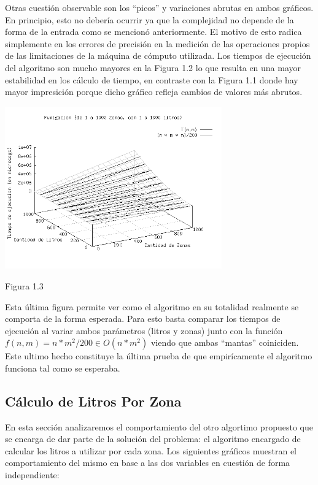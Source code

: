 \documentclass[a4paper,11pt] {article}
\begin{document}
Otras cuestión observable son los ``picos'' y variaciones abrutas en ambos gráficos. En principio, esto no debería ocurrir ya que la complejidad no depende de la forma de la entrada como se mencionó anteriormente. El motivo de esto radica simplemente en los errores de precisión en la medición de las operaciones propios de las limitaciones de la máquina de cómputo utilizada. Los tiempos de ejecución del algoritmo son mucho mayores en la Figura 1.2 lo que resulta en una mayor estabilidad en los cálculo de tiempo, en contraste con la Figura 1.1 donde hay mayor impresición porque dicho gráfico refleja cambios de valores más abrutos.

\begin{center}
 \includegraphics[width=0.7\textwidth]{Plots/Tp2Ej1-TiemposFumigacion-3d-bw.png}
\begin{center}
Figura 1.3
\end{center}
\end{center}

Esta última figura permite ver como el algoritmo en su totalidad realmente se comporta de la forma esperada. 
Para esto basta comparar los tiempos de ejecución al variar ambos parámetros (litros y zonas) junto con la función $f(n,m) = n*m^2/200 \in O(n*m^2)$ viendo que ambas ``mantas'' coiniciden. Este ultimo hecho constituye la última prueba de que empirícamente el algoritmo funciona tal como se esperaba.

\subsection*{Cálculo de Litros Por Zona}

En esta sección analizaremos el comportamiento del otro algortimo propuesto que se encarga de dar parte de la solución del problema: el algoritmo encargado de calcular los litros a utilizar por cada zona. Los siguientes gráficos muestran el comportamiento del mismo en base a las dos variables en cuestión de forma independiente:
\end{document}
